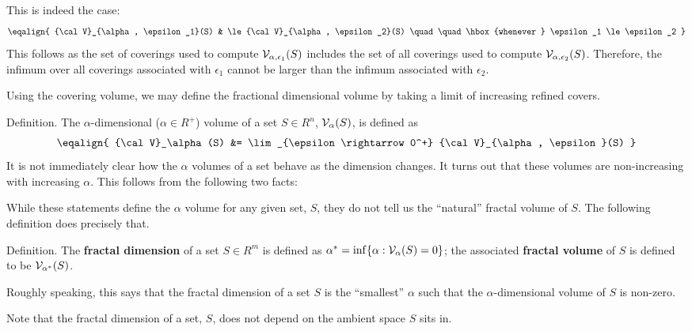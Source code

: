 {This is indeed the case:
$$
\eqalign{
	{\cal V}_{\alpha, \epsilon_1}(S) & \le {\cal V}_{\alpha, \epsilon_2}(S) \quad \quad \hbox{whenever  } \epsilon_1 \le \epsilon_2
}
$$
This follows as the set of coverings used to compute 
${\cal V}_{\alpha, \epsilon_1}(S)$ includes the set of all coverings used 
to compute ${\cal V}_{\alpha, \epsilon_2}(S)$. Therefore, the 
infimum over all coverings associated with $\epsilon_1$ cannot be larger
than the infimum associated with $\epsilon_2$.

Using the covering volume, we may define the fractional dimensional volume by
taking a limit of increasing refined covers.

\proclaim Definition. The $\alpha$-dimensional ($\alpha \in R^{+}$)
volume of a set $S \in R^n$, ${\cal V}_\alpha(S)$,
is defined as
$$
\eqalign{
	{\cal V}_\alpha(S) &= \lim_{\epsilon \rightarrow 0^+} {\cal V}_{\alpha, \epsilon}(S)
}
$$
It is not immediately clear how the $\alpha$ volumes of a set behave as the 
dimension changes. It turns out that these volumes are non-increasing 
with increasing $\alpha$. This follows from the following two facts:

\beginEnum
{}
\endEnum

While these statements define the $\alpha$ volume for any given set, $S$,
they do not tell us the ``natural'' fractal volume of $S$.
The following definition does precisely that.

\proclaim Definition. The {\bf fractal dimension} of a 
set $S \in R^m$ is defined as
$\alpha^* = \inf\{\alpha : {\cal V}_\alpha(S) = 0 \}$; the associated 
{\bf fractal volume} of $S$ is defined to be ${\cal V}_{\alpha^*}(S)$.

Roughly speaking, this says that the fractal dimension of a set $S$ is the
``smallest'' $\alpha$ such that the $\alpha$-dimensional volume of $S$ 
is non-zero.

Note that the fractal dimension of a set, $S$, does not depend on 
the ambient space $S$ sits in.

}
